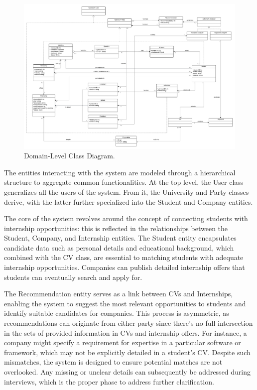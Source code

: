 \begin{figure}[H]
    \begin{center}
        \includegraphics[width=0.9\linewidth]{LaTeXCode/images/Class Diagram - RASD.png}
        \caption{Domain-Level Class Diagram.}
        \label{fig:domain_level_class_diagrams}
    \end{center}
\end{figure}

The entities interacting with the system are modeled through a hierarchical structure to aggregate common functionalities. At the top level, the User class generalizes all the users of the system. From it, the University and Party classes derive, with the latter further specialized into the Student and Company entities.

The core of the system revolves around the concept of connecting students with internship opportunities: this is reflected in the relationships between the Student, Company, and Internship entities. The Student entity encapsulates candidate data such as personal details and educational background, which combined with the CV class, are essential to matching students with adequate internship opportunities. Companies can publish detailed internship offers that students can eventually search and apply for.

The Recommendation entity serves as a link between CVs and Internships, enabling the system to suggest the most relevant opportunities to students and identify suitable candidates for companies. This process is asymmetric, as recommendations can originate from either party since there's no full intersection in the sets of provided information in CVs and internship offers. For instance, a company might specify a requirement for expertise in a particular software or framework, which may not be explicitly detailed in a student's CV. Despite such mismatches, the system is designed to ensure potential matches are not overlooked. Any missing or unclear details can subsequently be addressed during interviews, which is the proper phase to address further clarification.


